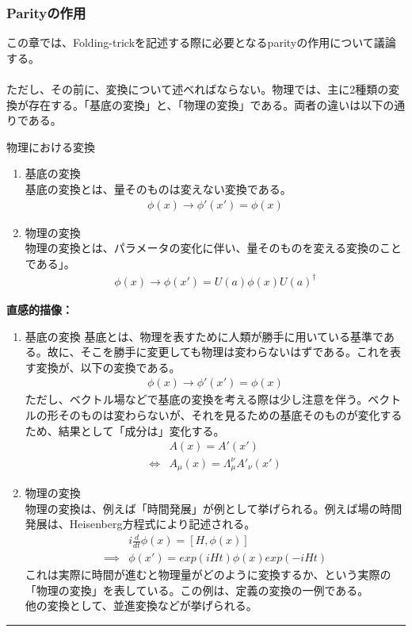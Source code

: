 \documentclass[dvipdfmx,a4paper,10.5pt]{article}
\numberwithin{equation}{section}
\newenvironment{intuitionbox}
{\begin{prooflabel}\textbf{直感的描像：}\end{prooflabel}\vspace{0.8em}}
{\par\vspace{1em}\hrule\vspace{1em}}
\begin{document}
\subsubsection{Parityの作用}
この章では、Folding-trickを記述する際に必要となるparityの作用について議論する。\\
\\
ただし、その前に、変換について述べればならない。物理では、主に2種類の変換が存在する。「基底の変換」と、「物理の変換」である。両者の違いは以下の通りである。
\begin{defbox}{物理における変換}
\begin{enumerate}
    \item 基底の変換\\
    基底の変換とは、量そのものは変えない変換である。
    \begin{align*}
        \phi(x)\to \phi'(x')=\phi(x)
    \end{align*}
    \item 物理の変換\\
    物理の変換とは、パラメータの変化に伴い、量そのものを変える変換のことである」。
    \begin{align*}
        \phi(x)\to \phi(x')=U(a)\phi(x)U(a)^{\dagger}
    \end{align*}
\end{enumerate}
\end{defbox}
\begin{intuitionbox}
    \begin{enumerate}
        \item 基底の変換
        基底とは、物理を表すために人類が勝手に用いている基準である。故に、そこを勝手に変更しても物理は変わらないはずである。これを表す変換が、以下の変換である。
        \begin{align*}
        \phi(x)\to \phi'(x')=\phi(x)
    \end{align*}
    ただし、ベクトル場などで基底の変換を考える際は少し注意を伴う。ベクトルの形そのものは変わらないが、それを見るための基底そのものが変化するため、結果として「成分は」変化する。
    \begin{align*}
        &A(x)=A'(x')\\
        \iff&A_{\mu}(x)=\Lambda_{\mu}^{\nu}A'_{\nu}(x')
    \end{align*}
    \item 物理の変換\\
    物理の変換は、例えば「時間発展」が例として挙げられる。例えば場の時間発展は、Heisenberg方程式により記述される。
    \begin{align*}
        &i\frac{d}{dt}\phi(x)=[H,\phi(x)]\\
        \implies&\phi(x')=exp(iHt)\phi(x)exp(-iHt)
    \end{align*}
    これは実際に時間が進むと物理量がどのように変換するか、という実際の「物理の変換」を表している。この例は、定義の変換の一例である。\\
    他の変換として、並進変換などが挙げられる。
    \end{enumerate}
\end{intuitionbox}
\end{document}
